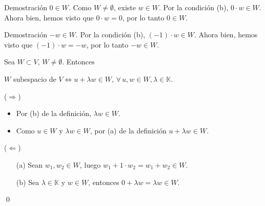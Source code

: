 \documentclass[handout]{beamer} %
\newcommand{\K}{\mathbb K}
\begin{document}
\begin{frame}

\begin{block}{Demostración $0 \in W$.}\pause
    Como $W \ne \emptyset$, existe $w \in W$. Por la condición (b), $0\cdot w \in W$. Ahora bien,  hemos visto que $0\cdot w =0$, por lo tanto $0 \in W$.
\end{block}
\pause
\begin{block}{Demostración $-w \in W$.}\pause
    Por la condición (b), $(-1)\cdot w \in W$. Ahora bien,  hemos visto que $(-1)\cdot w =-w$, por lo tanto $-w \in W$.
\end{block}
\vskip 2cm


\end{frame}

\begin{frame}
    \begin{observacion}
        Sea $W \subset V$,   $W \ne \emptyset$. Entonces
        \begin{center}
            $W$ subespacio de $V$\quad $\Leftrightarrow$\quad  $u + \lambda w \in W$,\;  $\forall\,u,w \in W,\lambda \in \K$.
        \end{center}
    \end{observacion}
    \pause
    \begin{demostracion}\pause

    ($\Rightarrow$) \pause
    \begin{itemize}
        \item  Por (b) de la definición, $\lambda w \in W$.
        \item  Como $u \in W$ y  $\lambda w \in W$, por (a)  de la definición  $u + \lambda w \in W$.
    \end{itemize}
    \pause

    ($\Leftarrow$) \pause
    
    \begin{itemize}
        \item[(a)] Sean $w_1 , w_2 \in W$, luego $w_1 + 1 \cdot w_2 = w_1 +w_2 \in W$.
        \item[(b)] Sea $\lambda \in \K$ y $w \in W$, entonces $0 + \lambda w = \lambda w \in W$.
    \end{itemize}
    \qed
    

    

    \end{demostracion}
\end{frame}
\end{document}
